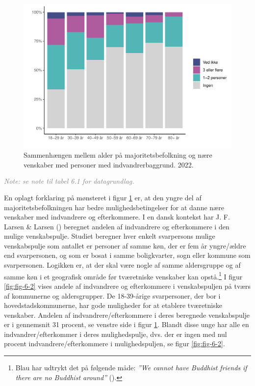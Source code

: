 \documentclass[
]{book}
\begin{document}
\begin{figure}
\includegraphics[width=1\linewidth]{en-befolkning-blander-sig_files/figure-latex/fig-6-1-1} \caption{Sammenhængen mellem alder på majoritetsbefolkning og nære venskaber med personer med indvandrerbaggrund. 2022.}\label{fig:fig-6-1}
\end{figure}

\begin{footnotesize}\textit{\textcolor{gray}{
Note: se note til tabel 6.1 for datagrundlag.
}}
\end{footnotesize}

En oplagt forklaring på mønsteret i figur \ref{fig:fig-6-1} er, at den yngre del af majoritetsbefolkningen har bedre mulighedsbetingelser for at danne nære venskaber med indvandrere og efterkommere. I en dansk kontekst har J. F. Larsen \& Larsen () beregnet andelen af indvandrere og efterkommere i den mulige venskabspulje. Studiet beregner hver enkelt svarpersons mulige venskabspulje som antallet er personer af samme køn, der er fem år yngre/ældre end svarpersonen, og som er bosat i samme boligkvarter, sogn eller kommune som svarpersonen. Logikken er, at der skal være nogle af samme aldersgruppe og af samme køn i et geografisk område før tværetniske venskaber kan opstå.\footnote{Blau har udtrykt det på følgende måde: \emph{''We cannot have Buddhist friends if there are no Buddhist around''} ().} I figur \ref{fig:fig-6-2} vises andele af indvandrere og efterkommere i venskabspuljen på tværs af kommunerne og aldersgrupper. De 18-39-årige svarpersoner, der bor i hovedstadskommunerne, har gode muligheder for at etablere tværetniske venskaber. Andelen af indvandrere/efterkommere i deres beregnede venskabspulje er i gennemsnit 31 procent, se venstre side i figur \ref{fig:fig-6-1}. Blandt disse unge har alle en indvandrer/efterkommer i deres mulighedspulje, dvs. der er ingen med nul procent indvandrere/efterkommere i mulighedspuljen, se figur \ref{fig:fig-6-2}.
\end{document}

